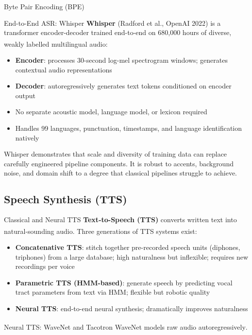 \begin{v3topic}{Byte Pair Encoding (BPE)}
\begin{v3topic}{End-to-End ASR: Whisper}
    \textbf{Whisper} (Radford et al., OpenAI 2022) is a transformer encoder-decoder trained end-to-end on 680{,}000 hours of diverse, weakly labelled multilingual audio\textsuperscript{\cite[][p.~11]{dhamaniIntroductionGenerativeAI2024}}:
    \begin{itemize}
        \item \textbf{Encoder}: processes 30-second log-mel spectrogram windows; generates contextual audio representations
        \item \textbf{Decoder}: autoregressively generates text tokens conditioned on encoder output
        \item No separate acoustic model, language model, or lexicon required
        \item Handles 99 languages, punctuation, timestamps, and language identification natively
    \end{itemize}
    Whisper demonstrates that scale and diversity of training data can replace carefully engineered pipeline components.
    It is robust to accents, background noise, and domain shift to a degree that classical pipelines struggle to achieve.
\end{v3topic}

\subsection{Speech Synthesis (TTS)}

\begin{v3topic}{Classical and Neural TTS}
    \textbf{Text-to-Speech (TTS)} converts written text into natural-sounding audio.
    Three generations of TTS systems exist\textsuperscript{\cite[][p.~11]{dhamaniIntroductionGenerativeAI2024}}:
    \begin{itemize}
        \item \textbf{Concatenative TTS}: stitch together pre-recorded speech units (diphones, triphones) from a large database; high naturalness but inflexible; requires new recordings per voice
        \item \textbf{Parametric TTS (HMM-based)}: generate speech by predicting vocal tract parameters from text via HMM; flexible but robotic quality
        \item \textbf{Neural TTS}: end-to-end neural synthesis; dramatically improves naturalness
    \end{itemize}

\end{v3topic}
\begin{v3topic}{Neural TTS: WaveNet and Tacotron}
    WaveNet models raw audio
    autoregressively\textsuperscript{\cite{oordWaveNetGenerativeModel2016}}.


\end{v3topic}
\end{v3topic}
